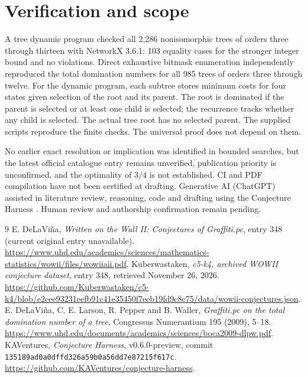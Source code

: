 \documentclass[11pt]{article}
\begin{document}
\section{Verification and scope}
A tree dynamic program checked all 2,286 nonisomorphic trees of orders three through thirteen with NetworkX 3.6.1: 103 equality cases for the stronger integer bound and no violations. Direct exhaustive bitmask enumeration independently reproduced the total domination numbers for all 985 trees of orders three through twelve. For the dynamic program, each subtree stores minimum costs for four states given selection of the root and its parent. The root is dominated if the parent is selected or at least one child is selected; the recurrence tracks whether any child is selected. The actual tree root has no selected parent. The supplied scripts reproduce the finite checks. The universal proof does not depend on them.

No earlier exact resolution or implication was identified in bounded searches, but the latest official catalogue entry remains unverified, publication priority is unconfirmed, and the optimality of $3/4$ is not established. CI and PDF compilation have not been certified at drafting. Generative AI (ChatGPT) assisted in literature review, reasoning, code and drafting using the Conjecture Harness \cite{harness}. Human review and authorship confirmation remain pending.
\begin{thebibliography}{9}
 E. DeLaVi\~na, \emph{Written on the Wall II: Conjectures of Graffiti.pc}, entry 348 (current original entry unavailable). \url{https://www.uhd.edu/academics/sciences/mathematics-statistics/wowii/files/wowiiaii.pdf}.
 Kuberwastaken, \emph{c5-k4, archived WOWII conjecture dataset}, entry 348, retrieved November 26, 2026. \url{https://github.com/Kuberwastaken/c5-k4/blob/e2cee93231eefb91c41e35450f7eeb19fd9c8c75/data/wowii-conjectures.json}.
 E. DeLaVi\~na, C. E. Larson, R. Pepper and B. Waller, \emph{Graffiti.pc on the total domination number of a tree}, Congressus Numerantium 195 (2009), 5--18. \url{https://www.uhd.edu/documents/academics/sciences/boca2009-dlpw.pdf}.
 KAVentures, \emph{Conjecture Harness}, v0.6.0-preview, commit \texttt{135189ad0a0dffd326a59b0a56dd7e87215f617c}. \url{https://github.com/KAVentures/conjecture-harness}.
\end{thebibliography}
\end{document}

